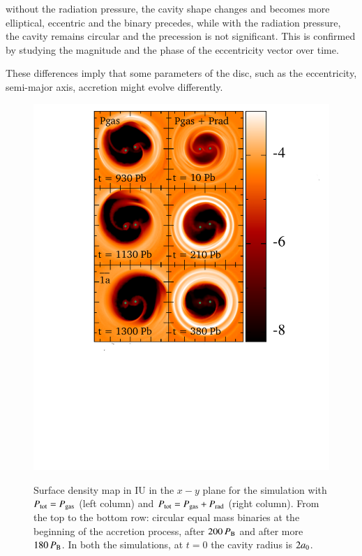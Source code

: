 \documentclass{aa}
\begin{document}
without the radiation pressure, the cavity shape changes and becomes more elliptical, eccentric and the binary precedes, while with the radiation pressure, the cavity remains circular and the precession is not significant. This is confirmed by studying the magnitude and the phase of the eccentricity vector over time. 

These differences imply that some parameters of the disc, such as the eccentricity, semi-major axis, accretion might evolve differently. 


\begin{figure}[h]
    \begin{center}
    \includegraphics[width=\columnwidth, trim=3cm 6cm 2.2cm 0cm, clip]{Fig/disc/file-mod.pdf} \\
    \caption{Surface density map in IU in the $x-y$ plane for the simulation with $P_{\rm tot}=P_{\rm gas}$ (left column) and $P_{\rm tot}=P_{\rm gas}+P_{\rm rad}$ (right column). From the top to the bottom row: circular equal mass binaries at the beginning of the accretion process, after $200 \, P_{\rm B }$ and after more $180 \, P_{\rm B }$. In both the simulations, at $t=0$ the cavity radius is $2a_{\rm 0}$.
}
\end{center}
\end{figure}
\end{document}
